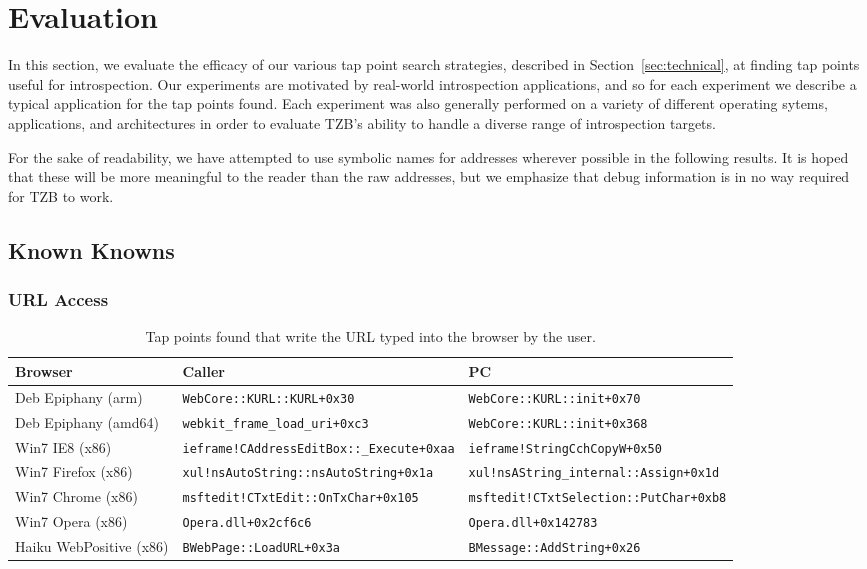 \section{Evaluation}
\label{sec:eval}

In this section, we evaluate the efficacy of our various tap point search
strategies, described in Section~\ref{sec:technical}, at finding tap
points useful for introspection. Our experiments are motivated by
real-world introspection applications, and so for each experiment we
describe a typical application for the tap points found. Each experiment
was also generally performed on a variety of different operating sytems,
applications, and architectures in order to evaluate TZB's ability to
handle a diverse range of introspection targets.

For the sake of readability, we have attempted to use symbolic names for
addresses wherever possible in the following results. It is hoped that
these will be more meaningful to the reader than the raw addresses, but
we emphasize that debug information is in no way required for TZB to
work.

\subsection{Known Knowns}

\subsubsection{URL Access}
\label{sec:eval:subsec:url}

\begin{table*}
    \centering
    \small
    \begin{tabular}{|l|l|l|}
        \hline
        Browser & Caller & PC \\
        \hline
        Deb Epiphany (arm) & \texttt{WebCore::KURL::KURL+0x30} & \texttt{WebCore::KURL::init+0x70} \\
        Deb Epiphany (amd64) & \texttt{webkit\_frame\_load\_uri+0xc3} & \texttt{WebCore::KURL::init+0x368} \\ 
        Win7 IE8 (x86) & \texttt{ieframe!CAddressEditBox::\_Execute+0xaa} & \texttt{ieframe!StringCchCopyW+0x50} \\
        Win7 Firefox (x86) & \texttt{xul!nsAutoString::nsAutoString+0x1a} & \texttt{xul!nsAString\_internal::Assign+0x1d} \\
        Win7 Chrome (x86) &  \texttt{msftedit!CTxtEdit::OnTxChar+0x105} & \texttt{msftedit!CTxtSelection::PutChar+0xb8} \\
        Win7 Opera (x86) &  \texttt{Opera.dll+0x2cf6c6} & \texttt{Opera.dll+0x142783} \\
        Haiku WebPositive (x86) & \texttt{BWebPage::LoadURL+0x3a} & \texttt{BMessage::AddString+0x26} \\
        \hline
    \end{tabular}
\caption{Tap points found that write the URL typed into the browser by
the user.}
\label{tbl:url}
\end{table*}


